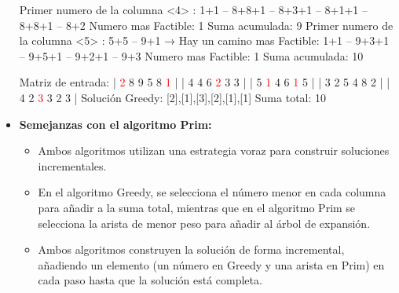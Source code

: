 \documentclass[12pt, letterpaper]{article}
\begin{document}
\begin{itemize}
            Primer numero de la columna <4> : 1+1 -- 8+8+1 -- 8+3+1 -- 8+1+1 -- 8+8+1 -- 8+2\newline
            Numero mas Factible: 1\newline
            Suma acumulada: 9\newline
  \newpage %
            Primer numero de la columna <5> : 5+5 -- 9+1\newline
              → Hay un camino mas Factible: 1+1 -- 9+3+1 -- 9+5+1 -- 9+2+1 -- 9+3\newline
            Numero mas Factible: 1\newline
            Suma acumulada: 10\newline

            Matriz de entrada:\newline
            | \textcolor{red}{2} 8 9 5 8 \textcolor{red}{1} |\newline
            | 4 4 6 \textcolor{red}{2} 3 3 |\newline
            | 5 \textcolor{red}{1} 4 6 \textcolor{red}{1} 5 |\newline
            | 3 2 5 4 8 2 |\newline
            | 4 2 \textcolor{red}{3} 3 2 3 |\newline
            Solución Greedy: [2],[1],[3],[2],[1],[1]\newline
            Suma total: 10
  \newpage %

        \item\textbf{Semejanzas con el algoritmo Prim:}
          \begin{itemize}
            \item Ambos algoritmos utilizan una estrategia voraz para construir soluciones incrementales.
            \item En el algoritmo Greedy, se selecciona el número menor en cada columna para añadir a la suma total, mientras que en el algoritmo Prim se selecciona la arista de menor peso para añadir al árbol de expansión.
            \item Ambos algoritmos construyen la solución de forma incremental, añadiendo un elemento (un número en Greedy y una arista en Prim) en cada paso hasta que la solución está completa.
          \end{itemize}


\end{itemize}
\end{document}
